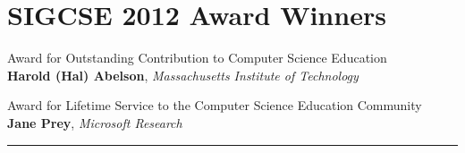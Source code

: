 
{\centering
     \section*{SIGCSE 2012 Award Winners}
}

\noindent Award for Outstanding Contribution to Computer Science Education  \\
\hspace*{5em}\textbf{Harold (Hal) Abelson}, \textit{Massachusetts Institute of Technology}

\noindent Award for Lifetime Service to the Computer Science Education Community \\
\hspace*{5em}\textbf{Jane Prey}, \textit{Microsoft Research}


\noindent\rule{5in}{0.02cm}

